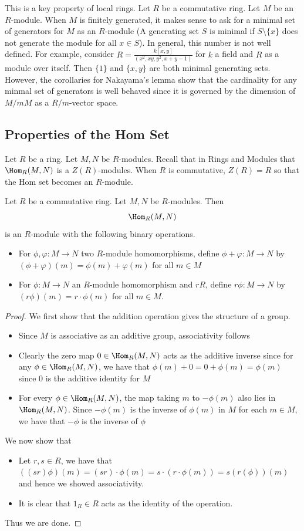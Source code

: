\documentclass[a4paper]{article}
\begin{document}
This is a key property of local rings. Let $R$ be a commutative ring. Let $M$ be an $R$-module. When $M$ is finitely generated, it makes sense to ask for a minimal set of generators for $M$ as an $R$-module (A generating set $S$ is minimal if $S\setminus\{x\}$ does not generate the module for all $x\in S$). In general, this number is not well defined. For example, consider $R=\frac{k[x,y]}{(x^2,xy,y^2,x+y-1)}$ for $k$ a field and $R$ as a module over itself. Then $\{1\}$ and $\{x,y\}$ are both minimal generating sets. \\

However, the corollaries for Nakayama's lemma show that the cardinality for any minmal set of generators is well behaved since it is governed by the dimension of $M/mM$ as a $R/m$-vector space. 

\subsection{Properties of the Hom Set}
Let $R$ be a ring. Let $M,N$ be $R$-modules. Recall that in Rings and Modules that $\Hom_R(M,N)$ is a $Z(R)$-modules. When $R$ is commutative, $Z(R)=R$ so that the Hom set becomes an $R$-module. 

\begin{prp}{}{} Let $R$ be a commutative ring. Let $M,N$ be $R$-modules. Then $$\Hom_R(M,N)$$ is an $R$-module with the following binary operations. 
\begin{itemize}
\item For $\phi,\varphi:M\to N$ two $R$-module homomorphisms, define $\phi+\varphi:M\to N$ by $(\phi+\varphi)(m)=\phi(m)+\varphi(m)$ for all $m\in M$
\item For $\phi:M\to N$ an $R$-module homomorphism and $r R$, define $r\phi:M\to N$ by $(r\phi)(m)=r\cdot\phi(m)$ for all $m\in M$. 
\end{itemize} 
\begin{proof}
We first show that the addition operation gives the structure of a group. 
\begin{itemize}
\item Since $M$ is associative as an additive group, associativity follows
\item Clearly the zero map $0\in\Hom_R(M,N)$ acts as the additive inverse since for any $\phi\in\Hom_R(M,N)$, we have that $\phi(m)+0=0+\phi(m)=\phi(m)$ since $0$ is the additive identity for $M$
\item For every $\phi\in\Hom_R(M,N)$, the map taking $m$ to $-\phi(m)$ also lies in $\Hom_R(M,N)$. Since $-\phi(m)$ is the inverse of $\phi(m)$ in $M$ for each $m\in M$, we have that $-\phi$ is the inverse of $\phi$
\end{itemize}
We now show that 
\begin{itemize}
\item Let $r,s\in R$, we have that $((sr)\phi)(m)=(sr)\cdot\phi(m)=s\cdot(r\cdot\phi(m))=s(r(\phi))(m)$ and hence we showed associativity. 
\item It is clear that $1_R\in R$ acts as the identity of the operation. 
\end{itemize}
Thus we are done. 
\end{proof}
\end{prp}
\end{document}
